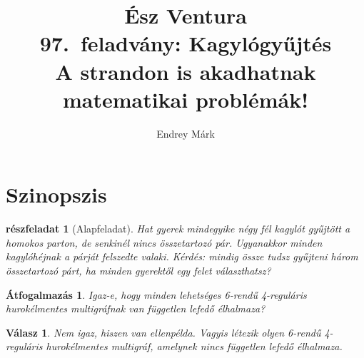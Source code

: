 \documentclass{article}
\title{Ész Ventura\\97.~feladvány: Kagylógyűjtés\\\large A strandon is akadhatnak matematikai problémák!}
\author{Endrey Márk}
\newtheorem{subproblem}{részfeladat}
\newtheorem*{reword}{Átfogalmazás}
\newtheorem*{answer}{Válasz}
\begin{document}
	\maketitle

	\tableofcontents

	\section{Szinopszis}

	\begin{subproblem}[Alapfeladat]
		Hat gyerek mindegyike négy fél kagylót gyűjtött a homokos parton, de senkinél nincs összetartozó pár. Ugyanakkor minden kagylóhéjnak a párját felszedte valaki. Kérdés: mindig össze tudsz gyűjteni három összetartozó párt, ha minden gyerektől egy felet választhatsz?
	\end{subproblem}
	\begin{reword}
		Igaz-e, hogy minden lehetséges 6-rendű 4-reguláris hurokélmentes multigráfnak van független lefedő élhalmaza?
	\end{reword}
	\begin{answer}
		Nem igaz, hiszen van ellenpélda. Vagyis létezik olyen 6-rendű 4-reguláris hurokélmentes multigráf, amelynek nincs független lefedő élhalmaza.
	\end{answer}
\end{document}
